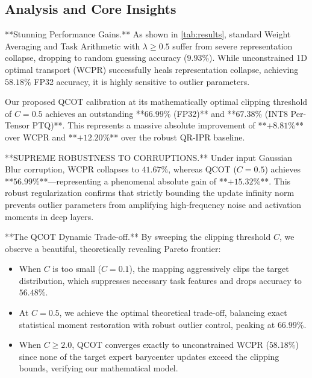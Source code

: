\documentclass{article}
\theoremstyle{plain}
\theoremstyle{definition}
\theoremstyle{remark}
\begin{document}
\subsection{Analysis and Core Insights}

**Stunning Performance Gains.** As shown in \cref{tab:results}, standard Weight Averaging and Task Arithmetic with $\lambda \ge 0.5$ suffer from severe representation collapse, dropping to random guessing accuracy ($9.93\%$). While unconstrained 1D optimal transport (WCPR) successfully heals representation collapse, achieving $58.18\%$ FP32 accuracy, it is highly sensitive to outlier parameters.

Our proposed QCOT calibration at its mathematically optimal clipping threshold of $C=0.5$ achieves an outstanding **$66.99\%$ (FP32)** and **$67.38\%$ (INT8 Per-Tensor PTQ)**. This represents a massive absolute improvement of **$+8.81\%$** over WCPR and **$+12.20\%$** over the robust QR-IPR baseline.

**SUPREME ROBUSTNESS TO CORRUPTIONS.** Under input Gaussian Blur corruption, WCPR collapses to $41.67\%$, whereas QCOT ($C=0.5$) achieves **$56.99\%$**—representing a phenomenal absolute gain of **$+15.32\%$**. This robust regularization confirms that strictly bounding the update infinity norm prevents outlier parameters from amplifying high-frequency noise and activation moments in deep layers.

**The QCOT Dynamic Trade-off.** By sweeping the clipping threshold $C$, we observe a beautiful, theoretically revealing Pareto frontier:
\begin{itemize}
    \item When $C$ is too small ($C=0.1$), the mapping aggressively clips the target distribution, which suppresses necessary task features and drops accuracy to $56.48\%$.
    \item At $C=0.5$, we achieve the optimal theoretical trade-off, balancing exact statistical moment restoration with robust outlier control, peaking at $66.99\%$.
    \item When $C \ge 2.0$, QCOT converges exactly to unconstrained WCPR ($58.18\%$) since none of the target expert barycenter updates exceed the clipping bounds, verifying our mathematical model.
\end{itemize}
\end{document}

